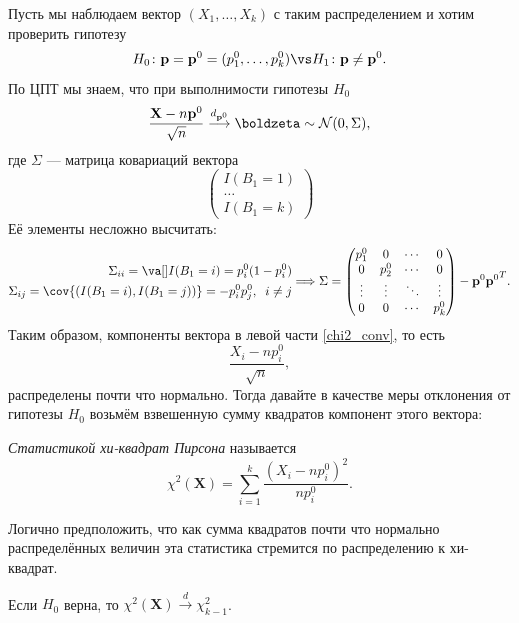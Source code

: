 Пусть мы наблюдаем вектор $(X_1, \ldots, X_k)$ с таким распределением и хотим проверить гипотезу
\[
H_0\colon \mathbf{p} = \mathbf{p}^0 = (p_1^0, \ldots, p_k^0) \vs H_1\colon \mathbf{p} \ne \mathbf{p}^0.
\]
По ЦПТ мы знаем, что при выполнимости гипотезы $H_0$
\begin{equation}\label{chi2_conv}
    \frac{\mathbf X - n \mathbf{p}^0}{\sqrt{n}} \stackrel{d_{\mathbf{p}^0}}{\longrightarrow} \boldzeta \sim \mathcal{N}(0, \Sigma),
\end{equation}
где $\Sigma$ --- матрица ковариаций вектора
\[
\begin{pmatrix}
    I(B_1 = 1)\\
    \ldots\\
    I(B_1 = k)
\end{pmatrix}
\]
Её элементы несложно высчитать: 
\begin{gather*}
    \begin{aligned}
        \Sigma_{ii} = \va[] I(B_1 = i) = p_i^0(1 - p_i^0)\\
    \Sigma_{ij} = \cov{(I(B_1 = i), I(B_1 = j))} = -p_i^0 p_j^0,\;\;i\ne j
    \end{aligned}
    \Longrightarrow
    \Sigma =
\begin{pmatrix}
p_1^0 & 0 & \cdots & 0\\
0 & p_2^0 & \cdots & 0\\
\vdots & \vdots & \ddots & \vdots\\
0 & 0 & \cdots & p_k^0
\end{pmatrix} - \mathbf{p}^0 {\mathbf{p}^0}^T.
\end{gather*}
Таким образом, компоненты вектора в левой части \eqref{chi2_conv}, то есть
\[
\frac{X_i - n p_i^0}{\sqrt{n}},
\]
распределены почти что нормально. Тогда давайте в качестве меры отклонения от гипотезы $H_0$ возьмём взвешенную сумму квадратов компонент этого вектора:
\begin{definition}
\textit{Статистикой хи-квадрат Пирсона} называется
\begin{equation}\label{chi2_stat}
	\chi^2(\mathbf X) = \sum_{i=1}^k \frac{(X_i - n p_i^0)^2}{n p_i^0}.
\end{equation}
\end{definition}
Логично предположить, что как сумма квадратов почти что нормально распределённых величин эта статистика стремится по распределению к хи-квадрат.

\begin{theorem}{}{}
Если $H_0$ верна, то $\chi^2(\mathbf X) \stackrel{d}{\longrightarrow} \chi^2_{k-1}$.
\end{theorem}

